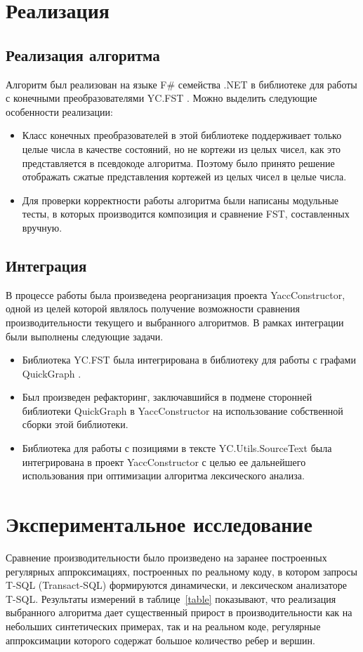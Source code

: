 \section{Реализация}
\subsection{Реализация алгоритма}
Алгоритм был реализован на языке F\# семейства .NET в библиотеке для работы с конечными преобразователями YC.FST \cite{polubelova}. Можно выделить следующие особенности реализации:

\begin{itemize}
\item Класс конечных преобразователей в этой библиотеке поддерживает только целые числа в качестве состояний, но не кортежи из целых чисел, как это представляется в псевдокоде алгоритма. Поэтому было принято решение отображать сжатые представления кортежей из целых чисел в целые числа.
\item Для проверки корректности работы алгоритма были написаны модульные тесты, в которых производится композиция и сравнение FST, составленных вручную.
\end{itemize} 


\subsection{Интеграция}
В процессе работы была произведена реорганизация проекта YaccConstructor, одной из целей которой являлось получение возможности сравнения производительности текущего и выбранного алгоритмов. В рамках интеграции были выполнены следующие задачи.

\begin{itemize}
\item Библиотека YC.FST была интегрирована в библиотеку для работы с графами QuickGraph \cite{quick_graph}.
\item Был произведен рефакторинг, заключавшийся в подмене сторонней библиотеки QuickGraph в YaccConstructor на использование собственной сборки этой библиотеки.
\item Библиотека для работы с позициями в тексте YC.Utils.SourceText \cite{source_text} была интегрирована в проект YaccConstructor с целью ее дальнейшего использования при оптимизации алгоритма лексического анализа.
\end{itemize} 

\section{Экспериментальное исследование}
Сравнение производительности было произведено на заранее построенных регулярных аппроксимациях, построенных по реальному коду, в котором запросы T-SQL (Transact-SQL) формируются динамически, и лексическом анализаторе T-SQL. Результаты измерений в таблице~\ref{table} показывают, что реализация выбранного алгоритма дает существенный прирост в производительности как на небольших синтетических примерах, так и на реальном коде, регулярные аппроксимации которого содержат большое количество ребер и вершин.

